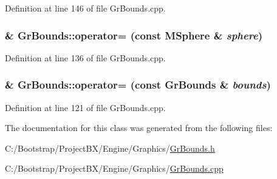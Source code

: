 Definition at line 146 of file GrBounds.cpp.\hypertarget{class_gr_bounds_bee924f5ceffe07812582bc17a04eabe}{
\subsubsection[{operator=}]{ \& GrBounds::operator= (const {\bf MSphere} \& {\em sphere})}}
\label{class_gr_bounds_bee924f5ceffe07812582bc17a04eabe}




Definition at line 136 of file GrBounds.cpp.\hypertarget{class_gr_bounds_893faa22e5cf17eebd344cf25ef2c6d8}{
\subsubsection[{operator=}]{ \& GrBounds::operator= (const {\bf GrBounds} \& {\em bounds})}}
\label{class_gr_bounds_893faa22e5cf17eebd344cf25ef2c6d8}




Definition at line 121 of file GrBounds.cpp.

The documentation for this class was generated from the following files:\begin{CompactItemize}
\item 
C:/Bootstrap/ProjectBX/Engine/Graphics/\hyperlink{_gr_bounds_8h}{GrBounds.h}\item 
C:/Bootstrap/ProjectBX/Engine/Graphics/\hyperlink{_gr_bounds_8cpp}{GrBounds.cpp}\end{CompactItemize}
